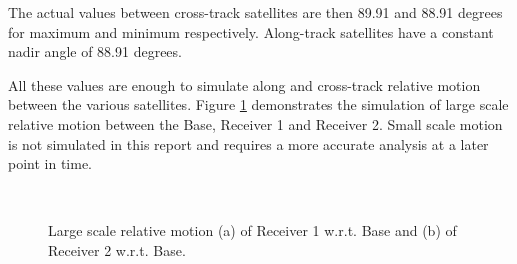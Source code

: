 The actual values between cross-track satellites are then 89.91 and 88.91 degrees for maximum and minimum respectively. Along-track satellites have a constant nadir angle of 88.91 degrees.

All these values are enough to simulate along and cross-track relative motion between the various satellites. Figure \ref{fig:relMotion} demonstrates the simulation of large scale relative motion between the Base, Receiver 1 and Receiver 2. Small scale motion is not simulated in this report and requires a more accurate analysis at a later point in time.

\begin{figure}
  \centering
  \\                
  \caption{Large scale relative motion (a) of Receiver 1 w.r.t. Base and (b) of Receiver 2 w.r.t. Base.}
  \label{fig:relMotion}
\end{figure}

